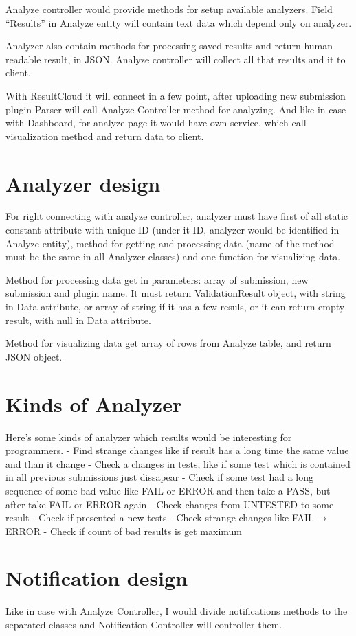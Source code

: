 \documentclass[a4paper,11pt]{article}
\begin{document}
Analyze controller would provide methods for setup available analyzers. Field “Results” in Analyze entity will contain text data which depend only on analyzer. 

Analyzer also contain methods for processing saved results and return human readable result, in JSON. Analyze controller will collect all that results and it to client. 

With ResultCloud it will connect in a few point, after uploading new submission plugin Parser will call Analyze Controller method for analyzing. And like in case with Dashboard, for analyze page it would have own service, which call visualization method and return data to client.

\section{Analyzer design}

For right connecting with analyze controller, analyzer must have first of all static constant attribute with unique ID (under it ID, analyzer would be identified in Analyze entity), method for getting and processing data (name of the method must be the same in all Analyzer classes) and one function for visualizing data.  

Method for processing data get in parameters: array of submission, new submission and plugin name. It must return ValidationResult object, with string in Data attribute, or array of string if it has a few resuls, or it can return empty result, with null in Data attribute.

Method for visualizing data get array of rows from Analyze table, and return JSON object.

\section{Kinds of Analyzer}

Here's some kinds of analyzer which results would be interesting for programmers.
- Find strange changes like if result has a long time the same value and than it change
- Check a changes in tests, like if some test which is contained in all previous submissions just dissapear
- Check if some test had a long sequence of some bad value like FAIL or ERROR and then take a PASS, but after take FAIL or ERROR again
- Check changes from UNTESTED to some result
- Check if presented a new tests
- Check strange changes like FAIL → ERROR
- Check if count of bad results is get maximum

\section{Notification design}

Like in case with Analyze Controller, I would divide notifications methods to the separated classes and Notification Controller will controller them. 
\end{document}

